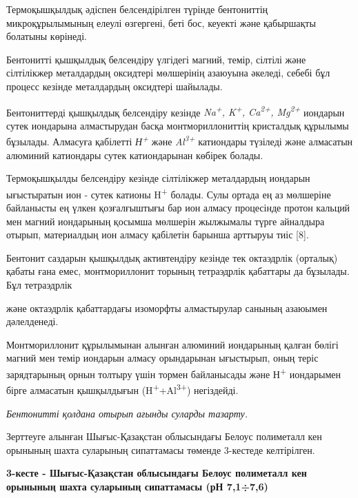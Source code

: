 Термоқышқылдық әдіспен белсендірілген түрінде бентониттің
микроқұрылымының елеулі өзгергені, беті бос, кеуекті және қабыршақты
болатыны көрінеді.

Бентонитті қышқылдық белсендіру үлгідегі магний, темір, сілтілі және
сілтілікжер металдардың оксидтері мөлшерінің азаюуына әкеледі, себебі
бұл процесс кезінде металдардың оксидтері шайылады.

Бентониттерді қышқылдық белсендіру кезінде \emph{Na\textsuperscript{+},
K\textsuperscript{+}, Ca\textsuperscript{2+}, Mg\textsuperscript{2+}}
иондарын сутек иондарына алмастырудан басқа монтмориллониттің кристалдық
құрылымы бұзылады. Алмасуға қабілетті \emph{Н\textsuperscript{+}} және
\emph{Al\textsuperscript{3+ }}катиондары түзіледі және алмасатын
алюминий катиондары сутек катиондарынан көбірек болады.

Термоқышқылды белсендіру кезінде сілтілікжер металдардың иондарын
ығыстыратын ион - сутек катионы H\textsuperscript{+} болады. Сулы ортада
ең аз мөлшеріне байланысты ең үлкен қозғалғыштығы бар ион алмасу
процесінде протон кальций мен магний иондарының қосымша мөлшерін
жылжымалы түрге айналдыра отырып, материалдың ион алмасу қабілетін
барынша арттыруы тиіс {[}8{]}.

Бентонит саздарын қышқылдық активтендіру кезінде тек октаэдрлік
(орталық) қабаты ғана емес, монтмориллонит торының тетраэдрлік қабаттары
да бұзылады. Бұл тетраэдрлік

және октаэдрлік қабаттардағы изоморфты алмастырулар санының азаюымен
дәлелденеді.

Монтмориллонит құрылымынан алынған алюминий иондарының қалған бөлігі
магний мен темір иондарын алмасу орындарынан ығыстырып, оның теріс
зарядтарының орнын толтыру үшін тормен байланысады және
Н\textsuperscript{+} иондарымен бірге алмасатын қышқылдығын
(H\textsuperscript{+}+Al\textsuperscript{3+}) негіздейді.

\emph{Бентонитті қолдана отырып ағынды суларды тазарту.}

Зерттеуге алынған Шығыс-Қазақстан облысындағы Белоус полиметалл кен
орынының шахта суларының сипаттамасы төменде 3-кестеде келтірілген.

\textbf{3-кесте - Шығыс-Қазақстан облысындағы Белоус полиметалл кен
орынының шахта суларының сипаттамасы (рН 7,1÷7,6)}

